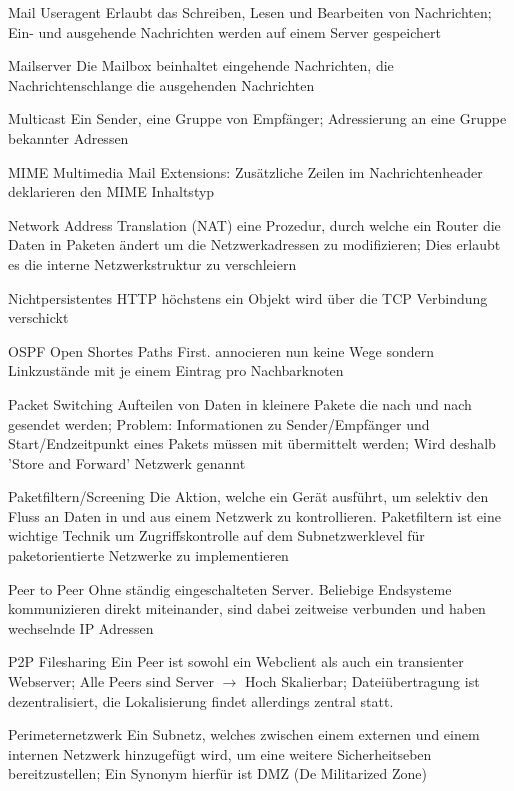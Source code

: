 \documentclass[a4paper]{article}
\begin{document}
\begin{multicols}{3}
\begin{description*}
        \item[Mail Useragent] Erlaubt das Schreiben, Lesen und Bearbeiten von Nachrichten; Ein- und ausgehende Nachrichten werden auf einem Server gespeichert
        \item[Mailserver] Die Mailbox beinhaltet eingehende Nachrichten, die Nachrichtenschlange die ausgehenden Nachrichten
        \item[Multicast] Ein Sender, eine Gruppe von Empfänger; Adressierung an eine Gruppe bekannter Adressen
        \item[MIME] Multimedia Mail Extensions: Zusätzliche Zeilen im Nachrichtenheader deklarieren den MIME Inhaltstyp
        \item[Network Address Translation (NAT)] eine Prozedur, durch welche ein Router die Daten in Paketen ändert um die Netzwerkadressen zu modifizieren; Dies erlaubt es die interne Netzwerkstruktur zu verschleiern
        \item[Nichtpersistentes HTTP] höchstens ein Objekt wird über die TCP Verbindung verschickt
        \item[OSPF] Open Shortes Paths First. annocieren nun keine Wege sondern Linkzustände mit je einem Eintrag pro Nachbarknoten
        \item[Packet Switching] Aufteilen von Daten in kleinere Pakete die nach und nach gesendet werden; Problem: Informationen zu Sender/Empfänger und Start/Endzeitpunkt eines Pakets müssen mit übermittelt werden; Wird deshalb 'Store and Forward' Netzwerk genannt
        \item[Paketfiltern/Screening] Die Aktion, welche ein Gerät ausführt, um selektiv den Fluss an Daten in und aus einem Netzwerk zu kontrollieren. Paketfiltern ist eine wichtige Technik um Zugriffskontrolle auf dem Subnetzwerklevel für paketorientierte Netzwerke zu implementieren
        \item[Peer to Peer] Ohne ständig eingeschalteten Server. Beliebige Endsysteme kommunizieren direkt miteinander, sind dabei zeitweise verbunden und haben wechselnde IP Adressen
        \item[P2P Filesharing] Ein Peer ist sowohl ein Webclient als auch ein transienter Webserver; Alle Peers sind Server $\rightarrow$ Hoch Skalierbar; Dateiübertragung ist dezentralisiert, die Lokalisierung findet allerdings zentral statt.
        \item[Perimeternetzwerk] Ein Subnetz, welches zwischen einem externen und einem internen Netzwerk hinzugefügt wird, um eine weitere Sicherheitseben bereitzustellen; Ein Synonym hierfür ist DMZ (De Militarized Zone)

\end{description*}
\end{multicols}
\end{document}
